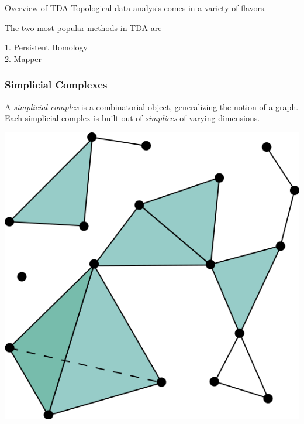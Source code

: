 \documentclass[usenames,dvipsnames,aspectratio=1610]{beamer}
\begin{document}
\begin{frame}{Overview of TDA}
  Topological data analysis comes in a variety of flavors. 
  
  The two most popular methods in TDA are
  \begin{center}
    1. Persistent Homology \\
    2.  Mapper
  \end{center}
\end{frame}




\begin{frame}
  \frametitle{Simplicial Complexes}
  A {\em simplicial complex} is a combinatorial object, generalizing the notion of a graph. Each
  simplicial complex is built out of {\em simplices} of varying dimensions.

  \begin{center}
    \includegraphics[scale=0.35]{images/Simplicial_complex_example.png}
  \end{center}
\end{frame}
\end{document}
